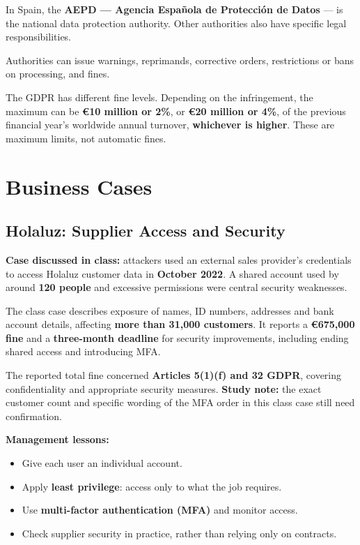 \documentclass[12pt,a4paper]{report}
\newcommand{\tightlist}{}
\begin{document}
In Spain, the \textbf{AEPD --- Agencia Española de Protección de Datos} --- is the national data protection authority. Other authorities also have specific legal responsibilities.

Authorities can issue warnings, reprimands, corrective orders, restrictions or bans on processing, and fines.

The GDPR has different fine levels. Depending on the infringement, the maximum can be \textbf{€10 million or 2\%}, or \textbf{€20 million or 4\%}, of the previous financial year's worldwide annual turnover, \textbf{whichever is higher}. These are maximum limits, not automatic fines.

\hypertarget{business-cases}{%
\section{Business Cases}\label{business-cases}}

\hypertarget{holaluz-supplier-access-and-security}{%
\subsection{Holaluz: Supplier Access and Security}\label{holaluz-supplier-access-and-security}}

\textbf{Case discussed in class:} attackers used an external sales provider's credentials to access Holaluz customer data in \textbf{October 2022}. A shared account used by around \textbf{120 people} and excessive permissions were central security weaknesses.

The class case describes exposure of names, ID numbers, addresses and bank account details, affecting \textbf{more than 31,000 customers}. It reports a \textbf{€675,000 fine} and a \textbf{three-month deadline} for security improvements, including ending shared access and introducing MFA.

The reported total fine concerned \textbf{Articles 5(1)(f) and 32 GDPR}, covering confidentiality and appropriate security measures. \textbf{Study note:} the exact customer count and specific wording of the MFA order in this class case still need confirmation.

\textbf{Management lessons:}

\begin{itemize}
\tightlist
\item
  Give each user an individual account.
\item
  Apply \textbf{least privilege}: access only to what the job requires.
\item
  Use \textbf{multi-factor authentication (MFA)} and monitor access.
\item
  Check supplier security in practice, rather than relying only on contracts.
\end{itemize}
\end{document}
